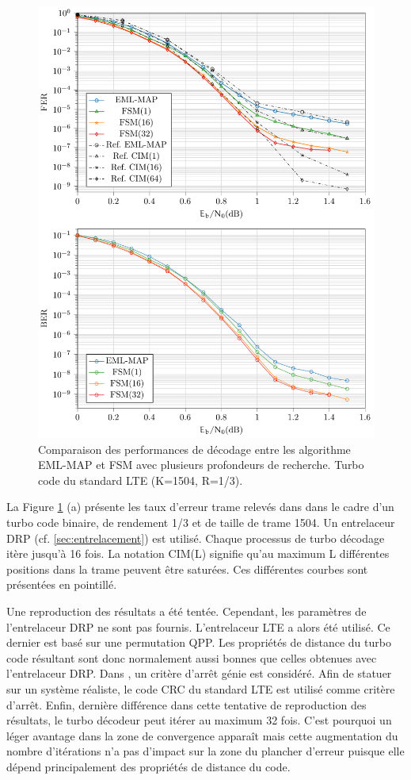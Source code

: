 \begin{figure}[!h]
	\centering
	\includegraphics[width=.8\textwidth]{main/ch2_fig/tikz/redec_fsm.pdf}
	\vspace*{.3cm}
	\caption{\label{fig:fsm}Comparaison des performances de décodage entre les algorithme EML-MAP et FSM avec plusieurs 
	profondeurs de recherche. Turbo code du standard LTE (K=1504, R=1/3).}
\end{figure}

La Figure \ref{fig:fsm} (a) présente les taux d'erreur trame relevés dans \cite{cim} dans le cadre d'un turbo code binaire,
de rendement 1/3 et de taille de trame 1504. Un entrelaceur DRP (cf. \ref{sec:entrelacement})  est utilisé. Chaque processus de turbo décodage itère 
jusqu'à 16 fois. La notation CIM(L) signifie qu'au maximum L différentes positions dans la trame peuvent être saturées. 
Ces différentes courbes sont présentées en pointillé.

Une reproduction des résultats a été tentée. Cependant, les paramètres de l'entrelaceur DRP ne sont pas fournis. 
L'entrelaceur LTE a alors été utilisé. Ce dernier est basé sur une permutation QPP. Les propriétés de distance du turbo 
code résultant sont donc normalement aussi bonnes que celles obtenues avec l'entrelaceur DRP. Dans \cite{cim}, un critère 
d'arrêt génie est considéré. Afin de statuer sur un système réaliste, le code CRC du standard LTE est utilisé comme 
critère d'arrêt. Enfin, dernière différence dans cette tentative de reproduction des résultats, le turbo décodeur peut 
itérer au maximum 32 fois. C'est pourquoi un léger avantage dans la zone de convergence apparaît mais cette augmentation du nombre 
d'itérations n'a pas d'impact sur la zone du plancher d'erreur puisque elle dépend principalement des propriétés 
de distance du code.

